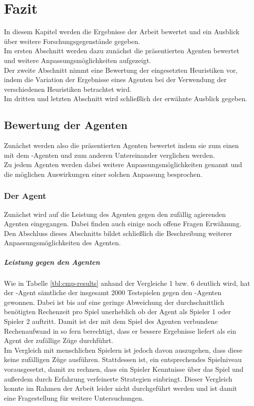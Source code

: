 \chapter{Fazit}
\label{Fazit}
\authormax

In diesem Kapitel werden die Ergebnisse der Arbeit bewertet und ein Ausblick über weitere Forschungsgegenstände gegeben.
\\Im ersten Abschnitt werden dazu zunächst die präsentierten Agenten bewertet und weitere Anpassungsmöglichkeiten aufgezeigt.
\\Der zweite Abschnitt nimmt eine Bewertung der eingesetzten Heuristiken vor, indem die Variation der Ergebnisse eines Agenten bei der Verwendung der verschiedenen Heuristiken betrachtet wird.
\\Im dritten und letzten Abschnitt wird schließlich der erwähnte Ausblick gegeben.   

\section{Bewertung der Agenten}
Zunächst werden also die präsentierten Agenten bewertet indem sie zum einen mit dem -Agenten und zum anderen Untereinander verglichen werden.
\\Zu jedem Agenten werden dabei weitere Anpassungsmöglichkeiten genannt und die möglichen Auswirkungen einer solchen Anpassung besprochen.
\subsection{Der Agent \mxZitat{\mc}}
\authormax
Zunächst wird auf die Leistung des Agenten \mxZitat{\mc} gegen den zufällig agierenden Agenten eingegangen. Dabei finden auch einige noch offene Fragen Erwähnung. Den Abschluss dieses Abschnitts bildet schließlich die Beschreibung weiterer Anpassungsmöglichkeiten des Agenten.  
\paragraph{Leistung gegen den Agenten }
Wie in Tabelle \ref{tbl:cmp-results} anhand der Vergleiche 1 bzw. 6 deutlich wird, hat der \mxZitat{\mc}-Agent sämtliche der insgesamt 2000 Testspielen gegen den -Agenten gewonnen. Dabei ist bis auf eine geringe Abweichung der durchschnittlich benötigten Rechenzeit pro Spiel unerheblich ob der Agent als Spieler 1 oder Spieler 2 auftritt. Damit ist der mit dem Spiel des Agenten verbundene Rechenaufwand in so fern berechtigt, dass er bessere Ergebnisse liefert als ein Agent der zufällige Züge durchführt.
\\Im Vergleich mit menschlichen Spielern ist jedoch davon auszugehen, dass diese keine zufälligen Züge ausführen. Stattdessen ist, ein entsprechendes Spielniveau vorausgesetzt, damit zu rechnen, dass ein Spieler Kenntnisse über das Spiel und außerdem durch Erfahrung verfeinerte Strategien einbringt. Dieser Vergleich konnte im Rahmen der Arbeit leider nicht durchgeführt werden und ist damit eine Fragestellung für weitere Untersuchungen.  
